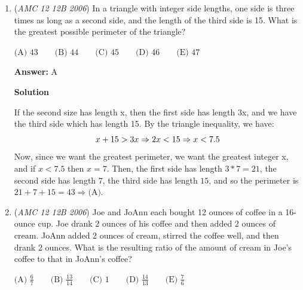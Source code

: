 \begin{enumerate}
 



\textbf{Solution 5 (Forward Casework + Listing)}

Casework:

 For the sake of simplicity, we are going to call the number $\overline{abc}$.

 1. If $a=1$:

 a. $c=2$. No such number exists.

 b. $c=4$. $b=2, 3$.

 c. $c=6$. $b=2, 3, 4, 5$.

 d. $c=8$. $b=2, 3, 4, 5, 6, 7$.

 2. If $a=2$: continue as above.

 We can count up that there are 34 such integers, so select $\boxed{B}$.

 


	\item (\textit{AMC 12 12B 2006}) In a triangle with integer side lengths, one side is three times as long as a second side, and the length of the third side is 15. What is the greatest possible perimeter of the triangle?


 $\text {(A) } 43 \qquad \text {(B) } 44 \qquad \text {(C) } 45 \qquad \text {(D) } 46 \qquad \text {(E) } 47$

 \textbf{Answer: }A



\textbf{Solution}

If the second size has length x, then the first side has length 3x, and we have the third side which has length 15. By the triangle inequality, we have: 
 \[\\ x+15>3x \Rightarrow 2x<15 \Rightarrow x<7.5\] Now, since we want the greatest perimeter, we want the greatest integer x, and if $x<7.5$ then $x=7$. Then, the first side has length $3*7=21$, the second side has length $7$, the third side has length $15$, and so the perimeter is $21+7+15=43 \Rightarrow \boxed{\text {(A)}}$.

 


	\item (\textit{AMC 12 12B 2006}) Joe and JoAnn each bought 12 ounces of coffee in a 16-ounce cup.  Joe drank 2 ounces of his coffee and then added 2 ounces of cream.  JoAnn added 2 ounces of cream, stirred the coffee well, and then drank 2 ounces.  What is the resulting ratio of the amount of cream in Joe's coffee to that in JoAnn's coffee?


 $\text {(A) } \frac 67 \qquad \text {(B) } \frac {13}{14} \qquad \text {(C) } 1 \qquad \text {(D) } \frac {14}{13} \qquad \text {(E) } \frac 76$


\end{enumerate}
